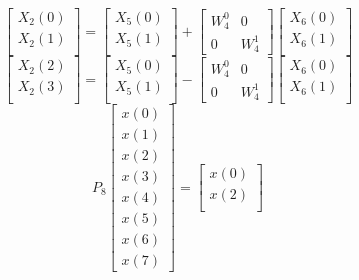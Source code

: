 \documentclass[journal,12pt,twocolumn]{IEEEtran}
\renewcommand\thesection{\arabic{section}}
\begin{document}
\begin{enumerate}[label=\thesection.\arabic*
	,ref=\thesection.\theenumi]
\begin{enumerate}[label=\arabic*.,ref=\thesection.\theenumi]
\begin{equation}
		\begin{bmatrix}
			X_{2}(0) \\ 
			X_{2}(1)\\ 
		\end{bmatrix}
		=
		\begin{bmatrix}
			X_{5}(0) \\ 
			X_{5}(1)\\ 
		\end{bmatrix}
		+
		\begin{bmatrix}
			W^{0}_{4} & 0\\
			0 & W^{1}_{4}
		\end{bmatrix}
		\begin{bmatrix}
			X_{6}(0) \\ 
			X_{6}(1) \\ 
		\end{bmatrix}
	\end{equation}
	\begin{equation}
		\begin{bmatrix}
			X_{2}(2) \\ 
			X_{2}(3)\\ 
		\end{bmatrix}
		=
		\begin{bmatrix}
			X_{5}(0) \\ 
			X_{5}(1)\\ 
		\end{bmatrix}
		-
		\begin{bmatrix}
			W^{0}_{4} & 0\\
			0 & W^{1}_{4}
		\end{bmatrix}
		\begin{bmatrix}
			X_{6}(0) \\ 
			X_{6}(1) \\ 
		\end{bmatrix}
	\end{equation}
	\begin{equation}
		P_{8}
		\begin{bmatrix}
			x(0) \\ 
			x(1) \\ 
			x(2) \\ 
			x(3) \\ 
			x(4) \\ 
			x(5) \\
			x(6) \\
			x(7)
		\end{bmatrix}
		= 
		\begin{bmatrix}
			x(0) \\ 
			x(2) \\ 

\end{bmatrix}
\end{equation}
\end{enumerate}
\end{enumerate}
\end{document}

